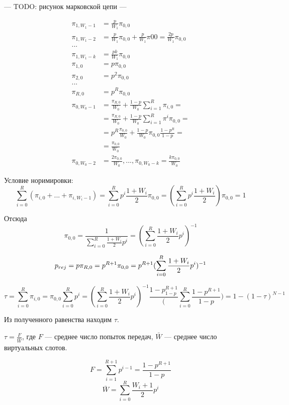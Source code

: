 --- TODO: рисунок марковской цепи ---

\begin{align*}
\pi_{1,W_1-1}   &= \frac{p}{W_1} \pi_{0,0} \\
\pi_{1,W_1-2}   &= \frac{p}{W_1} \pi_{0,0} + \frac{p}{W_1} \pi{00} = \frac{2p}{W_1}\pi_{0,0} \\
... \\
\pi_{1,W_1-k}   &= \frac{pk}{W_1} \pi_{0,0} \\
\pi_{1,0}       &= p \pi_{0,0} \\
\pi_{2,0}       &= p^2 \pi_{0,0} \\
... \\
\pi_{R,0}       &= p^R \pi_{0,0} \\
\pi_{0,W_0 - 1} &=     \frac{\pi_{R,0}}{W_0} + \frac{1 - p}{W_0} \sum_{i=1}^R \pi_{i,0} = \\
                &=     \frac{\pi_{R,0}}{W_0} + \frac{1 - p}{W_0} \sum_{i=1}^R \pi^i \pi_{0,0} = \\
                &= p^R \frac{\pi_{0,0}}{W_0} + \frac{1 - p}{W_0} \pi_{0,0} \frac{1 - p^R}{1 - p} = \\
                &= \frac{\pi_{0,0}}{W_0} \\
\pi_{0,W_0 - 2} &= \frac{2 \pi_{0,0}}{W_0}, ..., \pi_{0,W_0 - k} = \frac{k \pi_{0,0}}{W_0}
\end{align*}

Условие норимировки:
\[
\sum_{i=0}^R (\pi_{i,0} + ... + \pi_{i,W_i-1}) =
\sum_{i=0}^R p^i \frac{1 + W_i}{2} \pi_{0,0} =
(\sum_{i=0}^R p^i \frac{1 + W_i}{2}) \pi_{0,0} = 1
\]

Отсюда
\[
\pi_{0,0} = \frac{1}{\sum_{i=0}^R \frac{1 + W_i}{2} p^i} = (\sum_{i=0}^R \frac{1 + W_i}{2} p^i)^{-1}
\]

\[
p_{rej} = p \pi_{R,0} = p^{R+1} \pi_{0,0} = p^{R+1} (\sum_{i=0}^R \frac{1 + W_i}{2} p^i)^{-1}
\]

\[
\tau = \sum_{i = 0}^R \pi_{i,0} = \pi_{0,0} \sum_{i=0}^R p^i = (\sum_{i = 0}^R \frac{1 + W_i}{2} p^i)^{-1} \frac{1 - p^{R+1}_{1-p}} (\sum_{i=0}^R \frac{1 - p^{R+1}}{1-p}) = 1 - (1 - \tau)^{N - 1}
\]

Из полученного равенства находим $\tau$.

$\tau = \frac{F}{\bar{W}}$, где $F$ --- среднее число попыток передач, $\bar{W}$ --- среднее число виртуальных слотов.

\[
F = \sum_{i=1}^{R+1} p^{i-1} = \frac{1-p^{R+1}}{1 - p}
\]
\[
\bar{W} = \sum_{i=0}^R \frac{W_i+1}{2} p^i
\]

